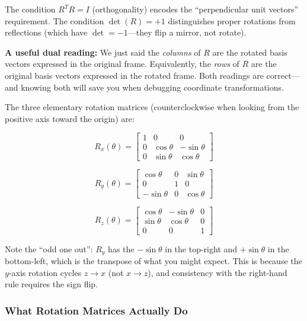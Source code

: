 The condition $R^T R = I$ (orthogonality) encodes the ``perpendicular unit vectors'' requirement. The condition $\det(R) = +1$ distinguishes proper rotations from reflections (which have $\det = -1$---they flip a mirror, not rotate).

\textbf{A useful dual reading:} We just said the \textit{columns} of $R$ are the rotated basis vectors expressed in the original frame. Equivalently, the \textit{rows} of $R$ are the original basis vectors expressed in the rotated frame. Both readings are correct---and knowing both will save you when debugging coordinate transformations.

The three elementary rotation matrices (counterclockwise when looking from the positive axis toward the origin) are:

\begin{equation}
R_x(\theta) = \begin{bmatrix} 1 & 0 & 0 \\ 0 & \cos\theta & -\sin\theta \\ 0 & \sin\theta & \cos\theta \end{bmatrix}
\end{equation}

\begin{equation}
R_y(\theta) = \begin{bmatrix} \cos\theta & 0 & \sin\theta \\ 0 & 1 & 0 \\ -\sin\theta & 0 & \cos\theta \end{bmatrix}
\end{equation}

\begin{equation}
R_z(\theta) = \begin{bmatrix} \cos\theta & -\sin\theta & 0 \\ \sin\theta & \cos\theta & 0 \\ 0 & 0 & 1 \end{bmatrix}
\end{equation}

Note the ``odd one out'': $R_y$ has the $-\sin\theta$ in the top-right and $+\sin\theta$ in the bottom-left, which is the transpose of what you might expect. This is because the $y$-axis rotation cycles $z \to x$ (not $x \to z$), and consistency with the right-hand rule requires the sign flip.

\subsubsection{What Rotation Matrices Actually Do}

